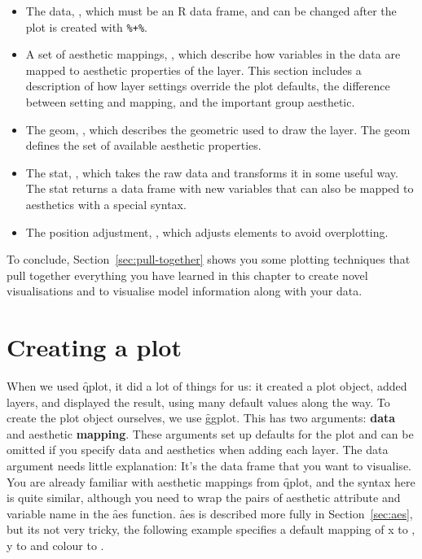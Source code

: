 \begin{itemize}
  \item The data, , which must be an R data frame, and can be changed after the plot is created with \verb|%+%|.

  \item A set of aesthetic mappings, , which describe how variables in the data are mapped to aesthetic properties of the layer.  This section includes a description of how layer settings override the plot defaults, the difference between setting and mapping, and the important group aesthetic.  

  \item The geom, , which describes the geometric used to draw the layer.  The geom defines the set of available aesthetic properties.

  \item The stat, , which takes the raw data and transforms it in some useful way.  The stat returns a data frame with new variables that can also be mapped to aesthetics with a special syntax.

  \item The position adjustment, , which adjusts elements to avoid overplotting.
\end{itemize}

To conclude, Section~\ref{sec:pull-together} shows you some plotting techniques that pull together everything you have learned in this chapter to create novel visualisations and to visualise model information along with your data.

\section{Creating a plot}
\label{sec:ggplot}

When we used \f{qplot}, it did a lot of things for us: it created a plot object, added layers, and displayed the result, using many default values along the way. To create the plot object ourselves, we use \f{ggplot}.  This has two arguments: {\bf data} and aesthetic {\bf mapping}. These arguments set up defaults for the plot and can be omitted if you specify data and aesthetics when adding each layer.  The data argument needs little explanation: It's the data frame that you want to visualise.  You are already familiar with aesthetic mappings from \f{qplot}, and the syntax here is quite similar, although you need to wrap the pairs of aesthetic attribute and variable name in the \f{aes} function.  \f{aes} is described more fully in Section~\ref{sec:aes}, but its not very tricky, the following example specifies a default mapping of x to , y to  and colour to .

